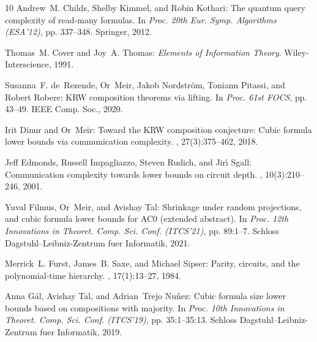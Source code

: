 \documentclass[11pt]{article}
\numberwithin{equation}{section}
\theoremstyle{definition}
\theoremstyle{plain}
\theoremstyle{definition}\newtheorem{notation}[theorem]{Notation}\theoremstyle{plain}
\begin{document}
\begin{thebibliography}{10}
{\sc Andrew~M. Childs, Shelby Kimmel, and Robin Kothari}: The quantum query
  complexity of read-many formulas.
\newblock In {\em Proc. 20th Eur. Symp. Algorithms (ESA'12)}, pp. 337--348.
  Springer, 2012.
\newblock [\epfmtdoi{10.1007/978-3-642-33090-2\_30}]

{\sc Thomas~M. Cover and Joy~A. Thomas}: {\em Elements of Information Theory}.
\newblock Wiley-Interscience, 1991.
\newblock [\epfmtdoi{10.1002/047174882X}]

{\sc Susanna~F. de~Rezende, Or~Meir, Jakob Nordstr{\"{o}}m, Toniann Pitassi,
  and Robert Robere}: {KRW} composition theorems via lifting.
\newblock In {\em Proc. 61st FOCS}, pp. 43--49. IEEE Comp. Soc., 2020.

{\sc Irit Dinur and Or~Meir}: Toward the {KRW} composition conjecture: Cubic
  formula lower bounds via communication complexity.
, 27(3):375--462, 2018.
\newblock [\epfmtdoi{10.1007/s00037-017-0159-x}]

{\sc Jeff Edmonds, Russell Impagliazzo, Steven Rudich, and Jir{\'{\i}} Sgall}:
  Communication complexity towards lower bounds on circuit depth.
, 10(3):210--246, 2001.
\newblock [\epfmtdoi{10.1007/s00037-001-8195-x}]

{\sc Yuval Filmus, Or~Meir, and Avishay Tal}: Shrinkage under random
  projections, and cubic formula lower bounds for {AC0} (extended abstract).
\newblock In {\em Proc. 12th Innovations in Theoret. Comp. Sci. Conf.
  (ITCS'21)}, pp. 89:1--7. Schloss Dagstuhl--Leibniz-Zentrum fuer Informatik,
  2021.

{\sc Merrick~L. Furst, James~B. Saxe, and Michael Sipser}: Parity, circuits,
  and the polynomial-time hierarchy.
, 17(1):13--27, 1984.
\newblock [\epfmtdoi{10.1007/BF01744431}]

{\sc Anna G{\'{a}}l, Avishay Tal, and Adrian~Trejo Nu{\~{n}}ez}: Cubic formula
  size lower bounds based on compositions with majority.
\newblock In {\em Proc. 10th Innovations in Theoret. Comp. Sci. Conf.
  (ITCS'19)}, pp. 35:1--35:13. Schloss Dagstuhl--Leibniz-Zentrum fuer
  Informatik, 2019.


\end{thebibliography}
\end{document}
